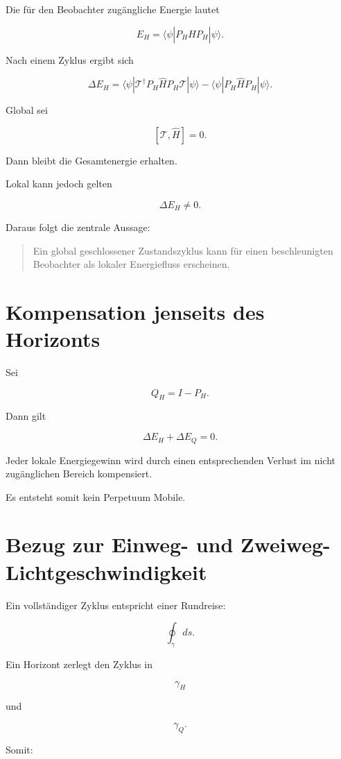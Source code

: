 \documentclass[11pt,a4paper]{article}
\begin{document}
	Die für den Beobachter zugängliche Energie lautet
	
	\[
	E_H
	=
	\langle \psi |
	P_H \hat H P_H
	|
	\psi
	\rangle.
	\]
	
	Nach einem Zyklus ergibt sich
	
	\[
	\Delta E_H
	=
	\langle \psi |
	\mathcal T^\dagger
	P_H \hat H P_H
	\mathcal T
	|
	\psi
	\rangle
	-
	\langle \psi |
	P_H \hat H P_H
	|
	\psi
	\rangle.
	\]
	
	Global sei
	
	\[
	[\mathcal T,\hat H]=0.
	\]
	
	Dann bleibt die Gesamtenergie erhalten.
	
	Lokal kann jedoch gelten
	
	\[
	\Delta E_H \neq 0.
	\]
	
	Daraus folgt die zentrale Aussage:
	
	\begin{quote}
		Ein global geschlossener Zustandszyklus kann für einen beschleunigten Beobachter als lokaler Energiefluss erscheinen.
	\end{quote}
	
	\section{Kompensation jenseits des Horizonts}
	
	Sei
	
	\[
	Q_H=I-P_H.
	\]
	
	Dann gilt
	
	\[
	\Delta E_H
	+
	\Delta E_Q
	=
	0.
	\]
	
	Jeder lokale Energiegewinn wird durch einen entsprechenden Verlust im nicht zugänglichen Bereich kompensiert.
	
	Es entsteht somit kein Perpetuum Mobile.
	
	\section{Bezug zur Einweg- und Zweiweg-Lichtgeschwindigkeit}
	
	Ein vollständiger Zyklus entspricht einer Rundreise:
	
	\[
	\oint_\gamma ds.
	\]
	
	Ein Horizont zerlegt den Zyklus in
	
	\[
	\gamma_H
	\]
	
	und
	
	\[
	\gamma_Q.
	\]
	
	Somit:
	
\end{document}
